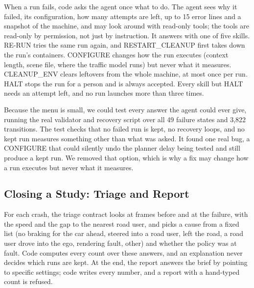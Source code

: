 \documentclass[conference]{IEEEtran}
\newcommand{\guide}[1]{}
\begin{document}
When a run fails, code asks the agent once what to do. The agent sees why it failed, its configuration, how many attempts are left, up to 15 error lines and a snapshot of the machine, and may look around with read-only tools; the tools are read-only by permission, not just by instruction. It answers with one of five skills. RE-RUN tries the same run again, and RESTART\_CLEANUP first takes down the run's containers. CONFIGURE changes how the run executes (context length, scene file, where the traffic model runs) but never what it measures. CLEANUP\_ENV clears leftovers from the whole machine, at most once per run. HALT stops the run for a person and is always accepted. Every skill but HALT needs an attempt left, and no run launches more than three times.

Because the menu is small, we could test every answer the agent could ever give, running the real validator and recovery script over all 49 failure states and 3,822 transitions. The test checks that no failed run is kept, no recovery loops, and no kept run measures something other than what was asked. It found one real bug, a CONFIGURE that could silently undo the planner delay being tested and still produce a kept run. We removed that option, which is why a fix may change how a run executes but never what it measures.


\subsection{Closing a Study: Triage and Report}\label{sec:explain}
\guide{The right end of the top band of Fig.~\ref{fig:system}. Triage: for each failed run the agent sees frames before the failure and the metrics, and answers a cause from a fixed list and whether the policy was at fault; counts over these answers are computed by code. Report: the agent answers the brief by citing setting ids; code writes every number, and a report with a hand-written count is refused.}

For each crash, the triage contract looks at frames before and at the failure, with the speed and the gap to the nearest road user, and picks a cause from a fixed list (no braking for the car ahead, steered into a road user, left the road, a road user drove into the ego, rendering fault, other) and whether the policy was at fault. Code computes every count over these answers, and an explanation never decides which runs are kept. At the end, the report answers the brief by pointing to specific settings; code writes every number, and a report with a hand-typed count is refused.
\end{document}
